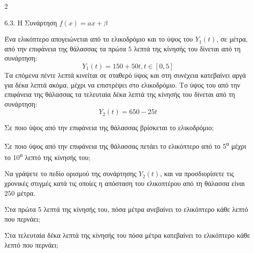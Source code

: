 \begin{ylh}{2}
    \item 6.3. Η Συνάρτηση $f(x)=ax+\beta$
\end{ylh}
Ένα ελικόπτερο απογειώνεται από το ελικοδρόμιο και το ύψος του $Y_{1}(t)$, σε μέτρα, από την επιφάνεια της θάλασσας τα πρώτα $5$ λεπτά της κίνησής του δίνεται από τη συνάρτηση:
\[Y_{1}(t) = 150 + 50t, t \in[0, 5]\]
Τα επόμενα πέντε λεπτά κινείται σε σταθερό ύψος και στη συνέχεια κατεβαίνει αργά για δέκα λεπτά ακόμα, μέχρι να επιστρέψει στο ελικοδρόμιο. Το ύψος του από την επιφάνεια της θάλασσας τα τελευταία δέκα λεπτά της κίνησής του δίνεται από τη συνάρτηση:
\[Y_{2}(t) = 650 - 25t\]
\begin{alist}
\item Σε ποιο ύψος από την επιφάνεια της θάλασσας βρίσκεται το ελικοδρόμιο;
\item Σε ποιο ύψος από την επιφάνεια της θάλασσας πετάει το ελικόπτερο από το 5\textsuperscript{ο} μέχρι το 10\textsuperscript{ο} λεπτό της κίνησής του; 
\item Να γράψετε το πεδίο ορισμού της συνάρτησης $Y_2(t)$, και να προσδιορίσετε τις χρονικές στιγμές κατά τις οποίες η απόσταση του ελικοπτέρου από τη θάλασσα είναι $250$ μέτρα.
\item
\begin{rlist}
\item
  Στα πρώτα 5 λεπτά της κίνησής του, πόσα μέτρα ανεβαίνει το ελικόπτερο κάθε λεπτό που περνάει; 

\item
  Στα τελευταία δέκα λεπτά της κίνησής του πόσα μέτρα κατεβαίνει το ελικόπτερο κάθε λεπτό που περνάει; 
\end{rlist}
\end{alist}

